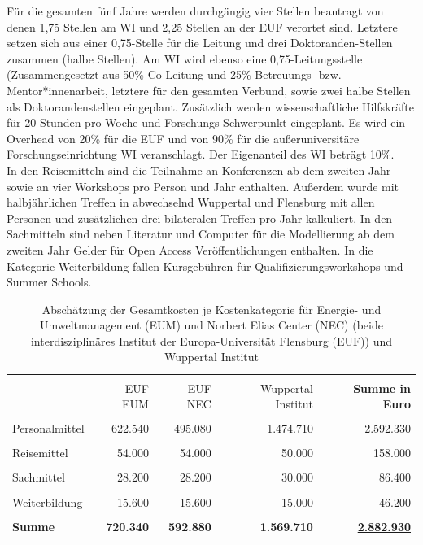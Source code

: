 \documentclass[a4paper,11pt,twoside]{scrartcl}
\begin{document}
Für die gesamten fünf Jahre werden durchgängig vier Stellen beantragt von denen 1,75 Stellen am WI und 2,25 Stellen an der EUF verortet sind. Letztere setzen sich aus einer 0,75-Stelle für die Leitung und drei Doktoranden-Stellen zusammen (halbe Stellen). Am WI wird ebenso eine 0,75-Leitungsstelle (Zusammengesetzt aus 50\% Co-Leitung und 25\% Betreuungs- bzw. Mentor*innenarbeit, letztere für den gesamten Verbund, sowie zwei halbe Stellen als Doktorandenstellen eingeplant. Zusätzlich werden wissenschaftliche Hilfskräfte für 20 Stunden pro Woche und Forschungs-Schwerpunkt eingeplant. Es wird ein Overhead von 20\% für die EUF und von 90\% für die außeruniversitäre Forschungseinrichtung WI veranschlagt. Der Eigenanteil des WI beträgt 10\%.\\
In den Reisemitteln sind die Teilnahme an Konferenzen ab dem zweiten Jahr sowie an vier Workshops pro Person und Jahr enthalten. Außerdem wurde mit halbjährlichen Treffen in abwechselnd Wuppertal und Flensburg mit allen Personen und zusätzlichen drei bilateralen Treffen pro Jahr kalkuliert. In den Sachmitteln sind neben Literatur und Computer für die Modellierung ab dem zweiten Jahr Gelder für Open Access Veröffentlichungen enthalten. In die Kategorie Weiterbildung fallen Kursgebühren für Qualifizierungsworkshops und Summer Schools.

\begin{table}[h]
\begin{center}
  \caption{Abschätzung der Gesamtkosten je Kostenkategorie für Energie- und Umweltmanagement (EUM) und Norbert Elias Center (NEC) (beide interdisziplinäres Institut der Europa-Universität Flensburg (EUF)) und Wuppertal Institut}
\small  
\begin{tabular}[h]{|l | r | r | r | r|}
\hline
&&&&\\
& EUF EUM & EUF NEC & Wuppertal Institut & \textbf{Summe in Euro}\\
\hline
\hline
&&&&\\
 Personalmittel & 622.540 & 495.080 & 1.474.710 & 2.592.330\\
 \hline
 &&&&\\
 Reisemittel & 54.000 & 54.000 & 50.000 & 158.000\\
 \hline
 &&&&\\
 Sachmittel & 28.200 & 28.200 & 30.000 & 86.400\\
 \hline
 &&&&\\
 Weiterbildung & 15.600 & 15.600 & 15.000 & 46.200\\
 \hline
 \hline
 &&&&\\
 \textbf{Summe}& \textbf{720.340} & \textbf{592.880} & \textbf{1.569.710} & \underline{\textbf{2.882.930}}\\
 \hline
 \end{tabular}
 \label{tab:kostenkalkulation}
\end{center}
\end{table}
\end{document}
